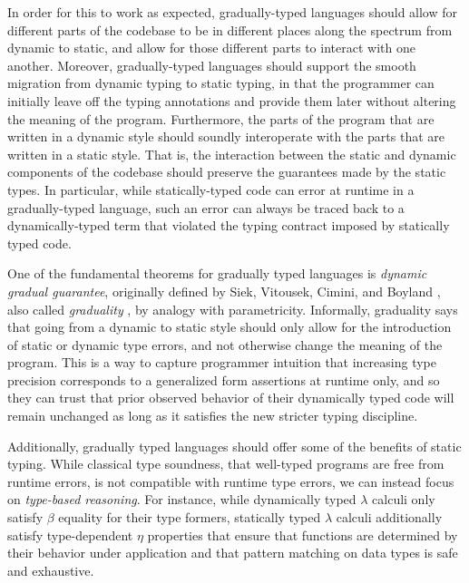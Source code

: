 In order for this to work as expected, gradually-typed languages should allow for
different parts of the codebase to be in different places along the spectrum from
dynamic to static, and allow for those different parts to interact with one another.
Moreover, gradually-typed languages should support the smooth migration from
dynamic typing to static typing, in that the programmer can initially leave off the
typing annotations and provide them later without altering the meaning of the program.
Furthermore, the parts of the program that are written in a dynamic style should soundly
interoperate with the parts that are written in a static style.
That is, the interaction between the static and dynamic components of the codebase
should preserve the guarantees made by the static types.
In particular, while statically-typed code can error at runtime in a gradually-typed language,
such an error can always be traced back to a dynamically-typed term that
violated the typing contract imposed by statically typed code.


One of the fundamental theorems for gradually typed languages is 
\emph{dynamic gradual guarantee}, originally defined by Siek, Vitousek, Cimini,
and Boyland \cite{siek_et_al:LIPIcs:2015:5031}, also called \emph{graduality} \cite{new-ahmed2018},
by analogy with parametricity.
Informally, graduality says that going from a dynamic to static style should only allow for the introduction of static or dynamic type errors, and not otherwise change the meaning of the program.
%
This is a way to capture programmer intuition that increasing type
precision corresponds to a generalized form assertions at runtime
only, and so they can trust that prior observed behavior of their
dynamically typed code will remain unchanged as long as it satisfies
the new stricter typing discipline.

Additionally, gradually typed languages should offer some of the
benefits of static typing. While classical type soundness, that
well-typed programs are free from runtime errors, is not compatible
with runtime type errors, we can instead focus on \emph{type-based
reasoning}. For instance, while dynamically typed $\lambda$ calculi
only satisfy $\beta$ equality for their type formers, statically typed
$\lambda$ calculi additionally satisfy type-dependent $\eta$
properties that ensure that functions are determined by their behavior
under application and that pattern matching on data types
is safe and exhaustive.

